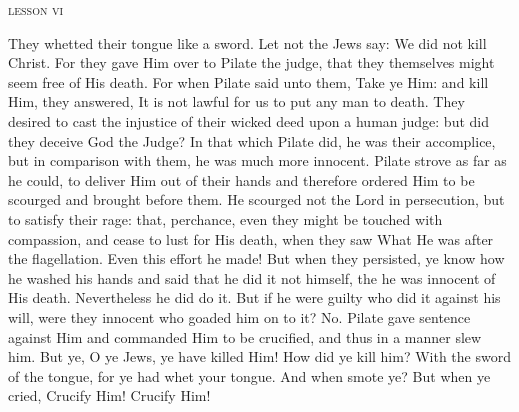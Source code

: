 \begin{center}{\textsc{lesson vi}}\end{center}

\begin{parcolumns}[rulebetween]{2}
{They whetted their tongue like a sword. Let not the Jews say: We did not kill Christ. For they gave Him over to Pilate the judge, that they themselves might seem free of His death. For when Pilate said unto them, Take ye Him: and kill Him, they answered, It is not lawful for us to put any man to death. They desired to cast the injustice of their wicked deed upon a human judge: but did they deceive God the Judge? In that which Pilate did, he was their accomplice, but in comparison with them, he was much more innocent. Pilate strove as far as he could, to deliver Him out of their hands and therefore ordered Him to be scourged and brought before them. He scourged not the Lord in persecution, but to satisfy their rage: that, perchance, even they might be touched with compassion, and cease to lust for His death, when they saw What He was after the flagellation. Even this effort he made! But when they persisted, ye know how he washed his hands and said that he did it not himself, the he was innocent of His death. Nevertheless he did do it. But if he were guilty who did it against his will, were they innocent who goaded him on to it? No. Pilate gave sentence against Him and commanded Him to be crucified, and thus in a manner slew him. But ye, O ye Jews, ye have killed Him! How did ye kill him? With the sword of the tongue, for ye had whet your tongue. And when smote ye? But when ye cried, Crucify Him! Crucify Him!}
\end{parcolumns}

